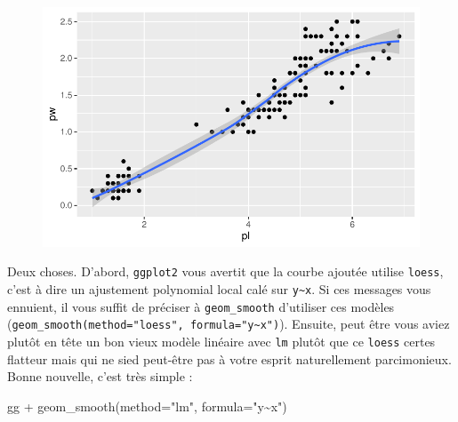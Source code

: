 \documentclass[
  letterpaper,
  DIV=11,
  numbers=noendperiod]{scrreprt}
\newenvironment{Shaded}{\begin{snugshade}}{\end{snugshade}}
\newcommand{\AttributeTok}[1]{\textcolor[rgb]{0.40,0.45,0.13}{#1}}
\newcommand{\FunctionTok}[1]{\textcolor[rgb]{0.28,0.35,0.67}{#1}}
\newcommand{\NormalTok}[1]{\textcolor[rgb]{0.00,0.23,0.31}{#1}}
\newcommand{\SpecialCharTok}[1]{\textcolor[rgb]{0.37,0.37,0.37}{#1}}
\newcommand{\StringTok}[1]{\textcolor[rgb]{0.13,0.47,0.30}{#1}}
\begin{document}
\begin{figure}[H]

{\centering \includegraphics{ggplot2_files/figure-pdf/unnamed-chunk-7-1.pdf}

}

\end{figure}

Deux choses. D'abord, \texttt{ggplot2} vous avertit que la courbe
ajoutée utilise \texttt{loess}, c'est à dire un ajustement polynomial
local calé sur \texttt{y\textasciitilde{}x}. Si ces messages vous
ennuient, il vous suffit de préciser à \texttt{geom\_smooth} d'utiliser
ces modèles
(\texttt{geom\_smooth(method="loess",\ formula="y\textasciitilde{}x")}).
Ensuite, peut être vous aviez plutôt en tête un bon vieux modèle
linéaire avec \texttt{lm} plutôt que ce \texttt{loess} certes flatteur
mais qui ne sied peut-être pas à votre esprit naturellement
parcimonieux. Bonne nouvelle, c'est très simple :

\begin{Shaded}
\begin{Highlighting}[]
\NormalTok{gg }\SpecialCharTok{+} \FunctionTok{geom\_smooth}\NormalTok{(}\AttributeTok{method=}\StringTok{"lm"}\NormalTok{, }\AttributeTok{formula=}\StringTok{"y\textasciitilde{}x"}\NormalTok{)}
\end{Highlighting}
\end{Shaded}
\end{document}
